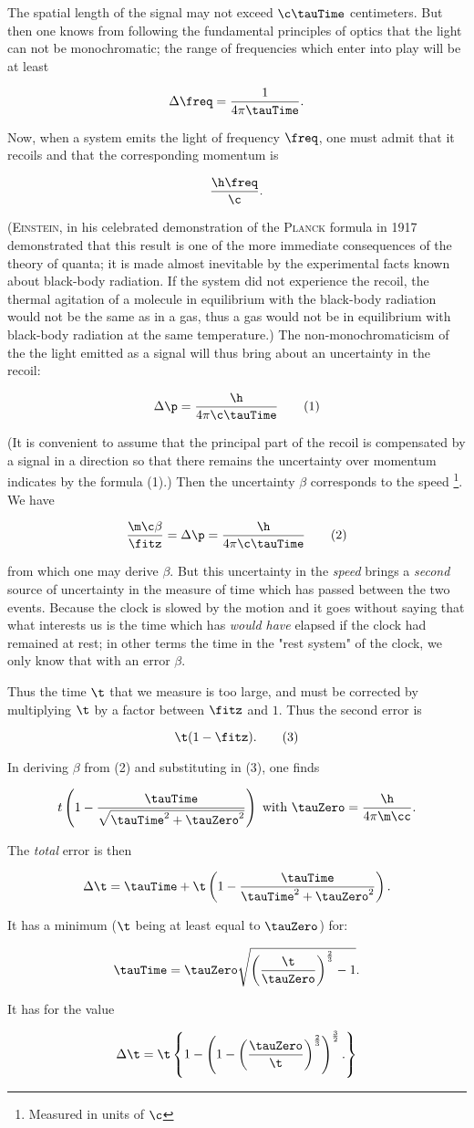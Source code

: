 \documentclass{article}
\newcommand{\nequ}[2]{
\begin{equation*}
#1
\tag{#2}
\end{equation*}
}
\newcommand{\uequ}[1]{
\begin{equation*}
#1
\end{equation*}
}
\newcommand{\inv}[1]{\frac{1}{#1}}
\renewcommand{\it}[1]{\textit{#1}}
\renewcommand{\sc}[1]{\textsc{#1}}
\newcommand{\ifitz}[1]{\frac{#1}{\fitz}}
\begin{document}
The spatial length of the signal may not exceed $\c\tauTime$ centimeters. But then one knows from following the fundamental principles of optics that the light can not be monochromatic; the range of frequencies which enter into play will be at least
\uequ{
\Delta\freq = \inv{4\pi\tauTime}.
}

Now, when a system emits the light of frequency $\freq$, one must admit that it recoils and that the corresponding momentum is
\uequ{
\frac{\h\freq}{\c}.
}
(\sc{Einstein}, in his celebrated demonstration of the \sc{Planck} formula in 1917 demonstrated that this result is one of the more immediate consequences of the theory of quanta; it is made almost inevitable by the experimental facts known about black-body radiation. If the system did not experience the recoil, the thermal agitation of a molecule in equilibrium with the black-body radiation would not be the same as in a gas, thus a gas would not be in equilibrium with black-body radiation at the same temperature.)
The non-monochromaticism of the the light emitted as a signal will thus bring about an uncertainty in the recoil:
\nequ{
\Delta\p = \frac{\h}{4\pi\c\tauTime}
}{1}
(It is convenient to assume that the principal part of the recoil is compensated by a signal in a direction so that there remains the uncertainty over momentum indicates by the formula (1).) Then the uncertainty $\beta$ corresponds to the speed \footnote{Measured in units of $\c$}. We have
\nequ{
\ifitz{\m\c\beta} = \Delta\p = \frac{\h}{4\pi\c\tauTime}
}{2}
from which one may derive $\beta$. But this uncertainty in the \it{speed} brings a \it{second} source of uncertainty in the measure of time which has passed between the two events. Because the clock is slowed by the motion and it goes without saying that what interests us is the time which has \it{would have} elapsed if the clock had remained at rest; in other terms the time in the "rest system" of the clock, we only know that with an error $\beta$.

Thus the time $\t$ that we measure is too large, and must be corrected by multiplying $\t$ by a factor between $\fitz$ and $1$. Thus the second error is
\nequ{
\t(1-\fitz).
}{3}

In deriving $\beta$ from (2) and substituting in (3), one finds
\uequ{
t\left(1-\frac{\tauTime}{\sqrt{\tauTime^2 + \tauZero^2}}\right) \text{ with } \tauZero = \frac{\h}{4\pi\m\cc}.
}
The \it{total} error is then
\uequ{
\Delta\t = \tauTime + \t\left(1-\frac{\tauTime}{\tauTime^2 + \tauZero^2}\right).
}
It has a minimum ($\t$ being at least equal to $\tauZero$) for:
\uequ{
\tauTime = \tauZero\sqrt{\left(\frac{\t}{\tauZero}\right)^{\frac{2}{3}} - 1}.
}
It has for the value
\uequ{
\Delta\t = \t\left\{
1-\left( 1 - \left(\frac{\tauZero}{\t}\right)^{\frac{2}{3}}\right)^{\frac{3}{2}}.
\right\}
}
\end{document}
